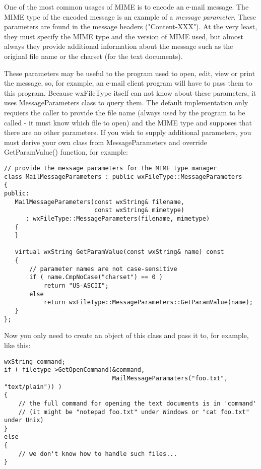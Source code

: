 \label{wxfiletypemessageparameters}

One of the most common usages of MIME is to encode an e-mail message. The MIME
type of the encoded message is an example of a {\it message parameter}. These
parameters are found in the message headers ("Content-XXX"). At the very least,
they must specify the MIME type and the version of MIME used, but almost always
they provide additional information about the message such as the original file
name or the charset (for the text documents).

These parameters may be useful to the program used to open, edit, view or print
the message, so, for example, an e-mail client program will have to pass them to
this program. Because wxFileType itself can not know about these parameters,
it uses MessageParameters class to query them. The default implementation only
requiers the caller to provide the file name (always used by the program to be
called - it must know which file to open) and the MIME type and supposes that
there are no other parameters. If you wish to supply additional parameters, you
must derive your own class from MessageParameters and override GetParamValue()
function, for example:

\begin{verbatim}
// provide the message parameters for the MIME type manager
class MailMessageParameters : public wxFileType::MessageParameters
{
public:
   MailMessageParameters(const wxString& filename,
                         const wxString& mimetype)
      : wxFileType::MessageParameters(filename, mimetype)
   {
   }

   virtual wxString GetParamValue(const wxString& name) const
   {
       // parameter names are not case-sensitive
       if ( name.CmpNoCase("charset") == 0 )
           return "US-ASCII";
       else
           return wxFileType::MessageParameters::GetParamValue(name);
   }
};
\end{verbatim}

Now you only need to create an object of this class and pass it to, for example,
\rtfsp{} like this:

\begin{verbatim}
wxString command;
if ( filetype->GetOpenCommand(&command,
                              MailMessageParamaters("foo.txt", "text/plain")) )
{
    // the full command for opening the text documents is in 'command'
    // (it might be "notepad foo.txt" under Windows or "cat foo.txt" under Unix)
}
else
{
    // we don't know how to handle such files...
}
\end{verbatim}

